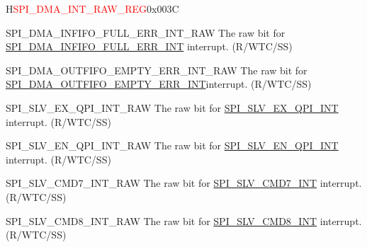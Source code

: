 \begin{register}{H}{\textcolor{red}{SPI\_DMA\_INT\_RAW\_REG}}{0x{}003C}\label{regdesc:SPIDMAINTRAWREG}
%
%
%
%
%
%
%
%
%
%
%
%
%
%
%
%
%
%
%
%
%
%
\regnewline%
\begin{regdesc}\begin{reglist}
\label{fielddesc:SPIDMAINFIFOFULLERRINTRAW}\item [SPI\_DMA\_INFIFO\_FULL\_ERR\_INT\_RAW] The raw bit for \hyperref[int:SPIINFIFOFULLERRINT]{SPI\_DMA\_INFIFO\_FULL\_ERR\_INT} interrupt. (R/WTC/SS)
\label{fielddesc:SPIDMAOUTFIFOEMPTYERRINTRAW}\item [SPI\_DMA\_OUTFIFO\_EMPTY\_ERR\_INT\_RAW] The raw bit for \hyperref[int:SPIOUTFIFOEMPTYERRINT]{SPI\_DMA\_OUTFIFO\_EMPTY\_ERR\_INT}interrupt. (R/WTC/SS)
\label{fielddesc:SPISLVEXQPIINTRAW}\item [SPI\_SLV\_EX\_QPI\_INT\_RAW] The raw bit for \hyperref[int:SPISLVEXQPIINT]{SPI\_SLV\_EX\_QPI\_INT} interrupt. (R/WTC/SS)
\label{fielddesc:SPISLVENQPIINTRAW}\item [SPI\_SLV\_EN\_QPI\_INT\_RAW] The raw bit for \hyperref[int:SPISLVENQPIINT]{SPI\_SLV\_EN\_QPI\_INT} interrupt. (R/WTC/SS)
\label{fielddesc:SPISLVCMD7INTRAW}\item [SPI\_SLV\_CMD7\_INT\_RAW] The raw bit for \hyperref[int:SPISLVCMD7INT]{SPI\_SLV\_CMD7\_INT} interrupt. (R/WTC/SS)
\label{fielddesc:SPISLVCMD8INTRAW}\item [SPI\_SLV\_CMD8\_INT\_RAW] The raw bit for \hyperref[int:SPISLVCMD8INT]{SPI\_SLV\_CMD8\_INT} interrupt. (R/WTC/SS)

\end{reglist}
\end{regdesc}
\end{register}
